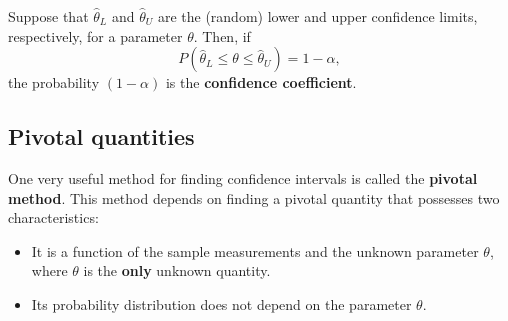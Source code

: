 Suppose that $\hat{\theta}_L$ and $\hat{\theta}_U$ are the (random) lower and upper confidence limits, respectively, for a parameter $\theta$. Then, if
$$P(\hat{\theta}_L \leq \theta \leq \hat{\theta}_U) = 1 - \alpha,$$
the probability $(1 - \alpha)$ is the \textbf{confidence coefficient}.

\subsection*{Pivotal quantities}
One very useful method for finding confidence intervals is called the \textbf{pivotal method}. This method depends on finding a pivotal quantity that possesses two characteristics:
\begin{itemize}
    \item It is a function of the sample measurements and the unknown parameter $\theta$, where $\theta$ is the \textbf{only} unknown quantity.
    \item Its probability distribution does not depend on the parameter $\theta$.
\end{itemize}



